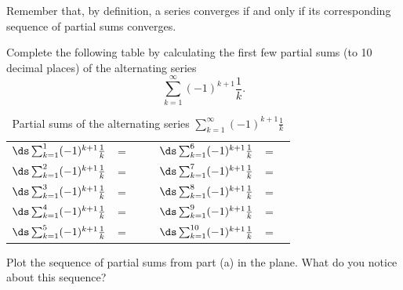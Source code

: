 \begin{activity} \label{8.4.Act1} Remember that, by definition, a series converges if and only if its corresponding sequence of partial sums converges.  
\ba
\item Complete the following table by calculating the first few partial sums (to 10 decimal places) of the alternating series
\[ \sum_{k=1}^{\infty} (-1)^{k+1}\frac{1}{k}.\]
\begin{table}[ht]
\begin{center}
\renewcommand{\arraystretch}{1.5}
\begin{tabular}{r c p{1.5in} p{0.25in}  r c p{1.5in}} \\
$\ds \sum_{k=1}^{1} (-1)^{k+1}\frac{1}{k}$  & =  &  & &$\ds \sum_{k=1}^{6} (-1)^{k+1}\frac{1}{k}$ 	& =& \\
$\ds \sum_{k=1}^{2} (-1)^{k+1}\frac{1}{k}$  & = &  & &$\ds \sum_{k=1}^{7} (-1)^{k+1}\frac{1}{k}$ 	& =& \\
$\ds \sum_{k=1}^{3} (-1)^{k+1}\frac{1}{k}$  & = &  & &$\ds \sum_{k=1}^{8} (-1)^{k+1}\frac{1}{k}$& =	& \\
$\ds \sum_{k=1}^{4} (-1)^{k+1}\frac{1}{k}$  & = &  & &$\ds \sum_{k=1}^{9} (-1)^{k+1}\frac{1}{k}$	& =& \\
$\ds \sum_{k=1}^{5} (-1)^{k+1}\frac{1}{k}$  & = &  & &$\ds \sum_{k=1}^{10} (-1)^{k+1}\frac{1}{k}$	& =& \\
\end{tabular}
\label{T:8.4.1_alt_harmonic}
\caption{Partial sums of the alternating series $\sum_{k=1}^{\infty} (-1)^{k+1} \frac{1}{k}$}
\end{center}
\end{table}



\item Plot the sequence of partial sums from part (a) in the plane. What do you notice about this sequence?



\ea
\end{activity}

